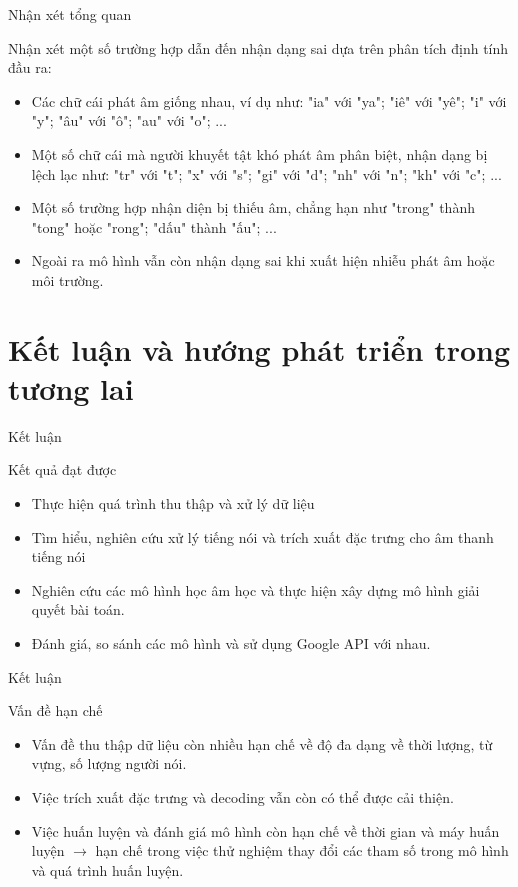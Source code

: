 \documentclass[10pt,a4paper,openany]{beamer}
\begin{document}
	\begin{frame}{Nhận xét tổng quan} \pause
		\begin{alertblock}{Nhận xét một số trường hợp dẫn đến nhận dạng sai dựa trên phân tích định tính đầu ra:}  \pause
			\begin{itemize}
				\item Các chữ cái phát âm giống nhau, ví dụ như: "ia" với "ya"; "iê" với "yê"; "i" với "y"; "âu" với "ô"; "au" với "o"; ...  \pause
				\item Một số chữ cái mà người khuyết tật khó phát âm phân biệt, nhận dạng bị lệch lạc như: "tr" với "t"; "x" với "s"; "gi" với "d"; "nh" với "n"; "kh" với "c"; ...  \pause
				\item Một số trường hợp nhận diện bị thiếu âm, chẳng hạn như "trong" thành "tong" hoặc "rong"; "dấu" thành "ấu"; ... \pause
				\item Ngoài ra mô hình vẫn còn nhận dạng sai khi xuất hiện nhiễu phát âm hoặc môi trường. \pause
			\end{itemize}
		\end{alertblock}
	\end{frame}

	\section{Kết luận và hướng phát triển trong tương lai}
	\begin{frame}{Kết luận}
		\begin{block}{Kết quả đạt được}  \pause
			\begin{itemize}
				\item Thực hiện quá trình thu thập và xử lý dữ liệu  \pause
				\item Tìm hiểu, nghiên cứu xử lý tiếng nói và trích xuất đặc trưng cho âm thanh tiếng nói  \pause
				\item Nghiên cứu các mô hình học âm học và thực hiện xây dựng mô hình giải quyết bài toán.  \pause
				\item Đánh giá, so sánh các mô hình và sử dụng Google API với nhau.
			\end{itemize}
		\end{block}
	\end{frame}
	
	\begin{frame}{Kết luận}
		\begin{alertblock}{Vấn đề hạn chế}  \pause
			\begin{itemize}
				\item Vấn đề thu thập dữ liệu còn nhiều hạn chế về độ đa dạng về thời lượng, từ vựng, số lượng người nói.  \pause
				\item Việc trích xuất đặc trưng và decoding vẫn còn có thể được cải thiện.  \pause
				\item Việc huấn luyện và đánh giá mô hình còn hạn chế về thời gian và máy huấn luyện $\rightarrow$ hạn chế trong việc thử nghiệm thay đổi các tham số trong mô hình và quá trình huấn luyện.
			\end{itemize}
		\end{alertblock}
	\end{frame}
	
\end{document}
